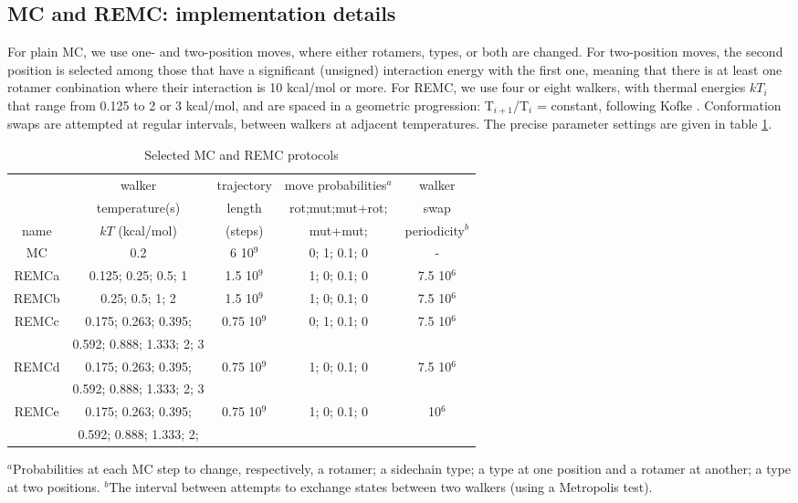 \subsection{MC and REMC: implementation details}
\label{sub:REMCdetails}
For plain MC, we use one- and two-position moves, where either rotamers, types, or both are changed.
For two-position moves, the second position is selected among those that have a significant (unsigned) interaction energy with the first one, meaning that there is at least one rotamer conbination where their interaction is 10 kcal/mol or more.
For REMC, we use four or eight walkers, with thermal energies $kT_i$ that range from 0.125
to 2 or 3 kcal/mol, and are spaced in a geometric progression: T$_{i+1}$/T$_i$ = constant, following Kofke \cite{Kofke02}.
Conformation swaps are attempted at regular intervals, between walkers at adjacent temperatures.
The precise parameter settings are given in table \ref{tab:parameters}.

\begin{table}[H]                            
\caption{Selected MC and REMC protocols}
\label{tab:parameters}                      
\begin{center} \small 
\renewcommand{\arraystretch}{0.75}
\begin{tabular}{ccccc} \hline \hline  
      &  walker                   & trajectory & move probabilities$^a$ & walker     \\ 
      &  temperature(s)           & length     & rot;mut;mut+rot; & swap       \\ 
name  & $kT$ (kcal/mol)           & (steps)    & mut+mut;         & periodicity$^b$ \smallskip \\  \hline 
MC    & 0.2                       &   6 10$^9$ & 0; 1; 0.1; 0     &  -          \smallskip \\      
REMCa & 0.125; 0.25; 0.5; 1       & 1.5 10$^9$ & 1; 0; 0.1; 0     & 7.5 10$^6$  \smallskip \\   
REMCb & 0.25; 0.5; 1; 2           & 1.5 10$^9$ & 1; 0; 0.1; 0     & 7.5 10$^6$  \smallskip \\ 
REMCc & 0.175; 0.263; 0.395;      & 0.75 10$^9$& 0; 1; 0.1; 0     & 7.5 10$^6$  \\
      & 0.592; 0.888; 1.333; 2; 3 &  &  &  \smallskip \\
REMCd & 0.175; 0.263; 0.395;      &0.75 10$^9$ & 1; 0; 0.1; 0     & 7.5 10$^6$  \\
      & 0.592; 0.888; 1.333; 2; 3 &  &  &  \smallskip \\
REMCe & 0.175; 0.263; 0.395;      &0.75 10$^9$ & 1; 0; 0.1; 0     &     10$^6$  \\ 
      & 0.592; 0.888; 1.333; 2;   &  &  &  \smallskip \\ \hline
\end{tabular}
\end{center}
{\small \noindent $^a$Probabilities at each MC step to change, respectively, a rotamer; a sidechain type; a type at one position and a rotamer at another;
a type at two positions. $^b$The interval between attempts to exchange states
between two walkers (using a Metropolis test).
}
\end{table}

